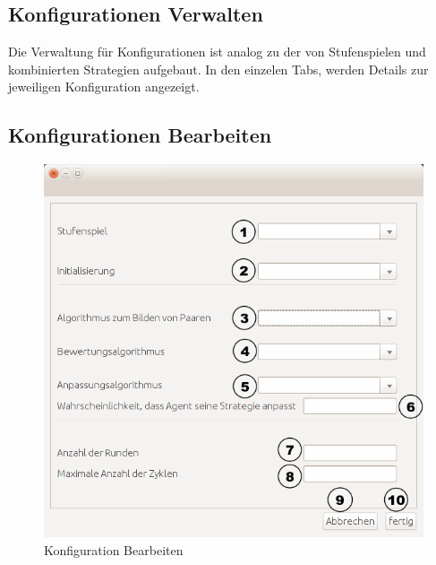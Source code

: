 \pagebreak

\subsection{Konfigurationen Verwalten}

Die Verwaltung für Konfigurationen ist analog zu der von Stufenspielen und kombinierten Strategien aufgebaut. In den einzelen Tabs, werden Details zur jeweiligen Konfiguration angezeigt.

\subsection{Konfigurationen Bearbeiten}

\begin{figure}[H] 
  \centering
     \includegraphics[width=1.0\textwidth]{GUI_Entwurf/KonfigurationBearbeiten.png}
  \caption{Konfiguration Bearbeiten}
  \label{fig:Bild2}
\end{figure}



